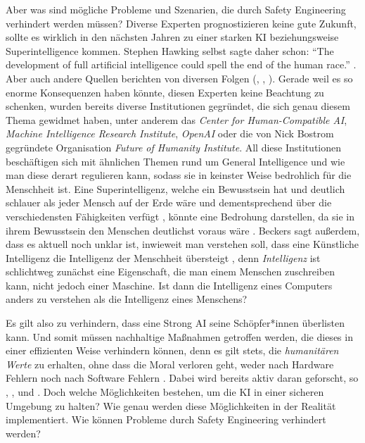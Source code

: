         Aber was sind mögliche Probleme und Szenarien, die durch Safety Engineering verhindert werden müssen? Diverse
        Experten prognostizieren keine gute Zukunft, sollte es wirklich in den nächsten Jahren zu einer starken KI
        beziehungsweise Superintelligence kommen. Stephen Hawking selbst sagte daher schon: ``The development
        of full artificial intelligence could spell the end of the human race.''  \cite{cellan-jones_2014}. Aber auch
        andere Quellen berichten von diversen Folgen (\cite[Bostrom]{bostrom_2014}, \cite[Beckers]{Beckers2018},
        \cite[Musk]{hern_2015}). Gerade weil es so enorme Konsequenzen haben könnte, diesen Experten keine Beachtung zu
        schenken, wurden bereits diverse Institutionen gegründet, die sich genau diesem Thema gewidmet haben, unter anderem
        das \textit{Center for Human-Compatible AI}, \textit{Machine Intelligence Research Institute}, \textit{OpenAI} oder
        die von Nick Bostrom gegründete Organisation \textit{Future of Humanity Institute}. All diese Institutionen
        beschäftigen sich mit ähnlichen Themen rund um General Intelligence und wie man diese derart regulieren kann,
        sodass sie in keinster Weise bedrohlich für die Menschheit ist. Eine Superintelligenz, welche ein Bewusstsein hat
        und deutlich schlauer als jeder Mensch auf der Erde wäre und dementsprechend über die verschiedensten Fähigkeiten
        verfügt \cite{bostrom_2006}, könnte eine Bedrohung darstellen, da sie in ihrem Bewusstsein den Menschen
        deutlichst voraus wäre \cite{Beckers2018}. Beckers sagt außerdem, dass es aktuell noch unklar ist, inwieweit man
        verstehen soll, dass eine Künstliche Intelligenz die Intelligenz der Menschheit übersteigt \cite[s. 237]{Beckers2018},
        denn \textit{Intelligenz} ist schlichtweg zunächst eine Eigenschaft, die man einem Menschen zuschreiben kann,
        nicht jedoch einer Maschine. Ist dann die Intelligenz eines Computers anders zu verstehen als die Intelligenz
        eines Menschens?

        Es gilt also zu verhindern, dass eine Strong AI seine Schöpfer*innen überlisten kann. Und somit müssen nachhaltige
        Maßnahmen getroffen werden, die dieses in einer effizienten Weise verhindern können, denn es gilt stets, die
        \textit{humanitären Werte} zu erhalten, ohne dass die Moral verloren geht, weder nach Hardware Fehlern noch
        nach Software Fehlern \cite[s. 7]{yampolskiy2013safety}. Dabei wird bereits aktiv daran geforscht, so
        \citeauthor*{yampolskiy2013safety}, \citep{gordon1998}, \citep{GordonSpears2003} und \citep{Spears}. Doch welche
        Möglichkeiten bestehen, um die KI in einer sicheren Umgebung zu halten? Wie genau werden diese Möglichkeiten
        in der Realität implementiert. Wie können Probleme durch Safety Engineering verhindert werden?


